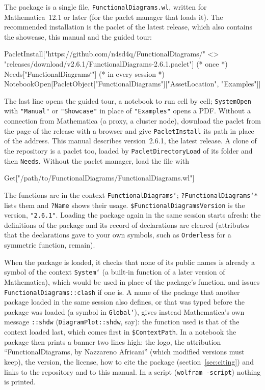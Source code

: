 \documentclass[11pt,a4paper]{article}
\newcommand{\pkg}[1]{\texttt{#1}}
\begin{document}
The package is a single file, \pkg{FunctionalDiagrams.wl}, written for Mathematica~12.1 or later (for the
paclet manager that loads it).
The recommended installation is the paclet of the latest release, which also contains the showcase, this manual and the
guided tour:
\begin{code}
PacletInstall["https://github.com/n4sd4q/FunctionalDiagrams/" <>
  "releases/download/v2.6.1/FunctionalDiagrams-2.6.1.paclet"]   (* once *)
Needs["FunctionalDiagrams`"]   (* in every session *)
NotebookOpen[PacletObject["FunctionalDiagrams"]["AssetLocation", "Examples"]]
\end{code}
The last line opens the guided tour, a notebook to run cell by cell; \pkg{SystemOpen} with \pkg{"Manual"} or
\pkg{"Showcase"} in place of \pkg{"Examples"} opens a PDF. Without a connection from Mathematica (a proxy, a cluster
node), download the paclet from the page of the release with a browser and give \pkg{PacletInstall} its path in place
of the address. This manual describes version~2.6.1, the latest release. A clone of the repository is a paclet too, loaded by \pkg{PacletDirectoryLoad} of its folder and then \pkg{Needs}. Without the paclet
manager, load the file with
\begin{code}
Get["/path/to/FunctionalDiagrams/FunctionalDiagrams.wl"]
\end{code}
The functions are in the context \pkg{FunctionalDiagrams`}; \pkg{?FunctionalDiagrams`*} lists them and \pkg{?Name}
shows their usage. \pkg{\$FunctionalDiagramsVersion} is the version, \pkg{"2.6.1"}. Loading the
package again in the same session starts afresh: the definitions of the package and its record of declarations are
cleared (attributes that the declarations gave to your own symbols, such as \pkg{Orderless} for a symmetric function,
remain).

When the package is loaded, it checks that none of its public names is already a symbol of the context \pkg{System`}
(a built-in function of a later version of Mathematica), which would be used in place of the package's function, and
issues \pkg{FunctionalDiagrams::clash} if one is. A name of the package that another package loaded in the same
session also defines, or that was typed before the package was loaded (a symbol in \pkg{Global`}), gives instead
Mathematica's own message \pkg{::shdw} (\pkg{DiagramPlot::shdw}, say): the function used is that of the context loaded
last, which comes first in \pkg{\$ContextPath}.
In a notebook the package then prints a banner two lines high: the logo, the attribution ``FunctionalDiagrams, by Nazzareno
Africani'' (which modified versions must keep), the version, the license, how to cite the package
(section~\ref{sec:citing}) and links to the repository and to this manual. In a script (\pkg{wolfram -script}) nothing
is printed.
\end{document}
